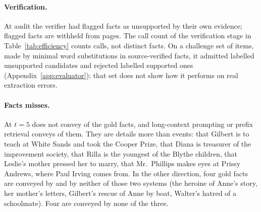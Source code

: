 \paragraph{Verification.}
At audit the verifier had flagged  facts as unsupported by their own
evidence; flagged facts are withheld from pages. The call count of the verification stage in
Table~\ref{tab:efficiency} counts calls, not distinct facts. On a challenge
set of  items, made by minimal word substitutions in source-verified facts, it
admitted  labelled unsupported candidates and rejected
 labelled supported ones (Appendix~\ref{app:evaluator}); that set does
not show how it performs on real extraction errors.

\paragraph{Facts \sys misses.}
At $t=5$ \sys does not convey  of the  gold facts,
and long-context prompting or prefix retrieval conveys  of them.
They are details more than events: that Gilbert is to teach at White Sands and took the
Cooper Prize, that Diana is treasurer of the improvement society, that Rilla is the youngest
of the Blythe children, that Leslie's mother pressed her to marry, that Mr.\ Phillips makes
eyes at Prissy Andrews, where Paul Irving comes from. In the other direction, four gold facts
are conveyed by \sys and by neither of those two systems (the heroine of Anne's story, her
mother's letters, Gilbert's rescue of Anne by boat, Walter's hatred of a schoolmate). Four
are conveyed by none of the three.

